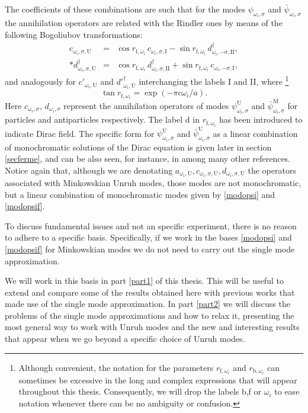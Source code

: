 The coefficients of these combinations are such that for the modes
$\psi_{\omega_i,\sigma}$ and $\bar \psi_{\omega_i,\sigma}$ the
annihilation operators are related with the Rindler ones by means of the
following Bogoliubov transformations:
\begin{eqnarray}\label{Bogoferm2}
\nonumber c_{{\omega_i},\sigma,\text{U}}&=&\cos{r_{\text{f},\omega_i}}\,c_{{\omega_i},
\sigma,\text{I}}-\sin r_{\text{f},\omega_i}\,d^\dagger_{{\omega_i},-\sigma,\text{II}},\\*
d_{{\omega_i},\sigma,\text{U}}^\dagger&=&\cos{r_{\text{f},\omega_i}}\,d^\dagger_{
{\omega_i},\sigma,\text{II}}+\sin r_{\text{f},\omega_i}\,c_{{\omega_i},-\sigma,\text{I}},
\end{eqnarray}
and analogously for $c'_{\omega_i,\text{U}}$ and $d'^\dagger_{\omega_i,\text{U}}$ interchanging the labels I and II, where \footnote{Although convenient, the notation for the parameters $r_{\text{f},\omega_i}$ and $r_{\text{b},\omega_i}$ can sometimes be excessive in the long and complex expressions that will appear throughout this thesis. Consequently, we will drop the labels b,f or $\omega_i$ to ease notation whenever there can be no ambiguity or confusion.}
\begin{equation}\label{defr}
\tan r_{\text{f},\omega_i}=\exp(-\pi c{{\omega_i}}/{a}).
\end{equation}
Here $c_{{\omega_i},\sigma}$, $d_{{\omega_i},\sigma}$ represent the
annihilation operators of modes $\psi^\text{U}_{\omega_i,\sigma}$ and
$\bar
\psi^\text{M}_{\omega_i,\sigma}$ for particles and antiparticles respectively. 
The label $\text{d}$ in $r_{\text{f},\omega_i}$ has been introduced to indicate
Dirac field. The specific form for $\psi^\text{U}_{\omega_i,\sigma}$
and $\bar
\psi^\text{U}_{\omega_i,\sigma}$ as a linear combination of monochromatic
solutions of the Dirac equation is given later in section \ref{secferme}, and can be also seen, for instance, in
\cite{Jauregui,chinada} among many other references. Notice again that,
although we are denotating $a_{\omega_i,\text{U}},
c_{\omega_i,\sigma,\text{U}}, d_{\omega_i,\sigma,\text{U}}$ the operators associated
with Minkowskian Unruh modes, those modes are not monochromatic, but a
linear combination of monochromatic modes given by \eqref{modopsi} and
\eqref{modopsif}.

To discuss fundamental issues and not an specific
experiment, there is no reason to adhere to a specific basis. Specifically,
if we work in the bases \eqref{modopsi} and
\eqref{modopsif} for Minkowskian modes we do
not need to carry out the single mode approximation.


We will work in this basis in  part \ref{part1} of this thesis. This will be useful to extend and compare some of the results obtained here with previous works that made use of the single mode approximation. In part \ref{part2} we will discuss the problems of the single mode approximations and how to relax it, presenting the most general way to work with Unruh modes and the new and interesting results that appear when we go beyond a specific choice of Unruh modes.







\cleardoublepage
